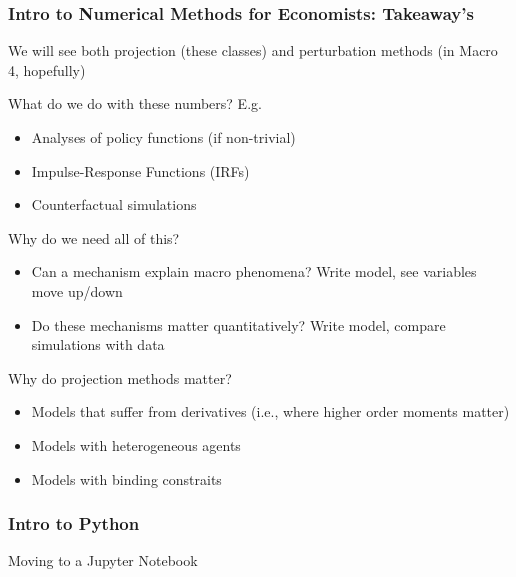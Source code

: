 \documentclass[10pt, aspectratio=1610, handout]{beamer}
\begin{document}
  \begin{frame}
    \frametitle{Intro to Numerical Methods for Economists: Takeaway's}

    We will see both projection (these classes) and perturbation methods (in Macro 4, hopefully)

    \vfill\pause

    What do we do with these numbers? E.g.
    \begin{itemize}
      \item Analyses of policy functions (if non-trivial)
      \item Impulse-Response Functions (IRFs)
      \item Counterfactual simulations
    \end{itemize}

    \vfill\pause

    Why do we need all of this?
    \begin{itemize}
      \item Can a mechanism explain macro phenomena? Write model, see variables move up/down
      \item Do these mechanisms matter quantitatively? Write model, compare simulations with data
    \end{itemize}

    \vfill\pause

    Why do projection methods matter?
    \begin{itemize}
      \item Models that suffer from derivatives (i.e., where higher order moments matter)
      \item Models with heterogeneous agents
      \item Models with binding constraits
    \end{itemize}

  \end{frame}

  \begin{frame}
    \frametitle{Intro to Python}

    Moving to a Jupyter Notebook

  \end{frame}
\end{document}
